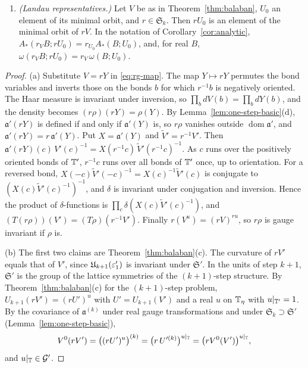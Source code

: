 \begin{proposition}
\begin{enumerate}[label=(\alph*)]
\begin{enumerate}[label=(\roman*)]
  \end{enumerate}
  Finally, for $r\in\mathfrak S'$ and a configuration $Y$ on $\T$ as in Definition~\ref{def:avg-transport}, for the lattices $\T$ and $\T'$: $(\mathfrak G_{rY}r_YB)(y,x)=(\mathfrak G_YB)(r^{-1}y,r^{-1}x)$.
\item \emph{(Landau representatives.)} Let $V$ be as in Theorem~\ref{thm:balaban}, $U_0$ an element of its minimal orbit, and $r\in\mathfrak S_k$. Then $rU_0$ is an element of the minimal orbit of $rV$. In the notation of Corollary~\ref{cor:analytic}, $A_*(r_VB;rU_0)=r_{U_0}A_*(B;U_0)$, and, for real $B$, $\omega(r_VB;rU_0)=r_V\,\omega(B;U_0)$.
\end{enumerate}
\end{proposition}

\begin{proof}
(a) Substitute $V=rY$ in \eqref{eq:rg-map}. The map $Y\mapsto rY$ permutes the bond variables and inverts those on the bonds $b$ for which $r^{-1}b$ is negatively oriented. The Haar measure is invariant under inversion, so $\prod_bdV(b)=\prod_bdY(b)$, and the density becomes $(r\rho)(rY)=\rho(Y)$. By Lemma~\ref{lem:one-step-basic}(d), $\mathfrak a'(rY)$ is defined if and only if $\mathfrak a'(Y)$ is, so $r\rho$ vanishes outside $\operatorname{dom}\mathfrak a'$, and $\mathfrak a'(rY)=r\,\mathfrak a'(Y)$. Put $X=\mathfrak a'(Y)$ and $\tilde V'=r^{-1}V'$. Then $\mathfrak a'(rY)(c)\,V'(c)^{-1}=X(r^{-1}c)\,\tilde V'(r^{-1}c)^{-1}$. As $c$ runs over the positively oriented bonds of $\T'$, $r^{-1}c$ runs over all bonds of $\T'$ once, up to orientation. For a reversed bond, $X(-c)\tilde V'(-c)^{-1}=X(c)^{-1}\tilde V'(c)$ is conjugate to $(X(c)\tilde V'(c)^{-1})^{-1}$, and $\delta$ is invariant under conjugation and inversion. Hence the product of $\delta$-functions is $\prod_c\delta(X(c)\tilde V'(c)^{-1})$, and $(T(r\rho))(V')=(T\rho)(r^{-1}V')$. Finally $r(V^u)=(rV)^{ru}$, so $r\rho$ is gauge invariant if $\rho$ is.

(b) The first two claims are Theorem~\ref{thm:balaban}(c). The curvature of $rV'$ equals that of $V'$, since $\mathfrak U_{k+1}(\varepsilon'_1)$ is invariant under $\mathfrak S'$. In the units of step $k+1$, $\mathfrak S'$ is the group of the lattice symmetries of the $(k+1)$-step structure. By Theorem~\ref{thm:balaban}(c) for the $(k+1)$-step problem, $U_{k+1}(rV')=(rU')^u$ with $U'=U_{k+1}(V')$ and a real $u$ on $\mathbb T_\eta$ with $u|_{\mathbb T'}=1$. By the covariance of $\mathfrak a^{(k)}$ under real gauge transformations and under $\mathfrak S_k\supset\mathfrak S'$ (Lemma~\ref{lem:one-step-basic}),
\[
V^0(rV')=\big((rU')^u\big)^{(k)}=\big(r\,U'^{(k)}\big)^{u|_\mathbb T}=\big(rV^0(V')\big)^{u|_\mathbb T},
\]
and $u|_\mathbb T\in\mathcal G'$.


\end{proof}
